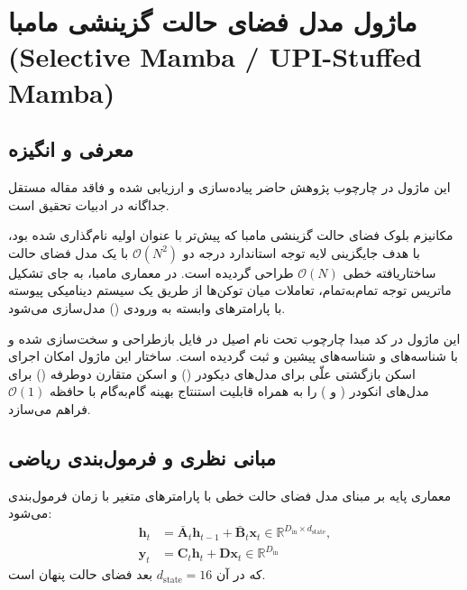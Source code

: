 \section{ماژول مدل فضای حالت گزینشی مامبا (Selective Mamba / UPI-Stuffed Mamba)}
\label{sec:module_upi_stuffed_mamba}

\subsection{معرفی و انگیزه}
این ماژول در چارچوب پژوهش حاضر پیاده‌سازی و ارزیابی شده و فاقد مقاله مستقل جداگانه در ادبیات تحقیق است.

مکانیزم بلوک فضای حالت گزینشی مامبا  که پیش‌تر با عنوان اولیه  نام‌گذاری شده بود، با هدف جایگزینی لایه توجه استاندارد درجه دو $\mathcal{O}(N^2)$ با یک مدل فضای حالت ساختاریافته خطی $\mathcal{O}(N)$ طراحی گردیده است. در معماری مامبا، به جای تشکیل ماتریس توجه تمام‌به‌تمام، تعاملات میان توکن‌ها از طریق یک سیستم دینامیکی پیوسته با پارامترهای وابسته به ورودی () مدل‌سازی می‌شود.

این ماژول در کد مبدا چارچوب تحت نام اصیل  در فایل  بازطراحی و سخت‌سازی شده و با شناسه‌های  و شناسه‌های پیشین  و  ثبت گردیده است. ساختار این ماژول امکان اجرای اسکن بازگشتی علّی برای مدل‌های دیکودر () و اسکن متقارن دوطرفه () برای مدل‌های انکودر ( و ) را به همراه قابلیت استنتاج بهینه گام‌به‌گام با حافظه $\mathcal{O}(1)$ فراهم می‌سازد.

\subsection{مبانی نظری و فرمول‌بندی ریاضی}
معماری پایه بر مبنای مدل فضای حالت خطی با پارامترهای متغیر با زمان فرمول‌بندی می‌شود:
\begin{align}
\mathbf{h}_t &= \bar{\mathbf{A}}_t \mathbf{h}_{t-1} + \bar{\mathbf{B}}_t \mathbf{x}_t \in \mathbb{R}^{D_{\text{in}} \times d_{\text{state}}}, \\
\mathbf{y}_t &= \mathbf{C}_t \mathbf{h}_t + \mathbf{D} \mathbf{x}_t \in \mathbb{R}^{D_{\text{in}}}
\end{align}
که در آن $d_{\text{state}} = 16$ بعد فضای حالت پنهان است.

